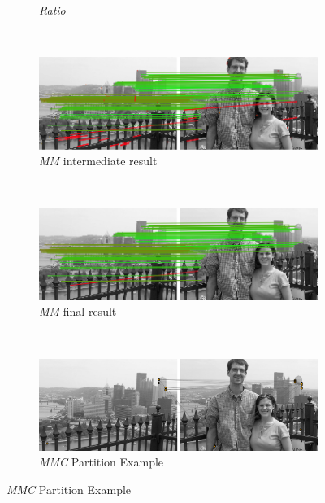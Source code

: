 \begin{figure}[h]
\begin{subfigure}[t]{0.5\columnwidth}
            \caption{\emph{Ratio}}
            \label{fig:unique}
        \end{subfigure}%
        ~ %
        \begin{subfigure}[t]{0.5\columnwidth}
            \centering
            \includegraphics[width=0.95\columnwidth]{images/mirror_match_with_pruned}
            \caption{\emph{MM} intermediate result}
            \label{fig:within}
        \end{subfigure}%
        \\ %
        \begin{subfigure}[t]{0.5\columnwidth}
            \centering
            \includegraphics[width=0.95\columnwidth]{images/mirror_match}
            \caption{\emph{MM} final result}
            \label{fig:without}
        \end{subfigure}%
        ~ %
        \begin{subfigure}[t]{0.5\columnwidth}
            \centering
            \includegraphics[width=0.95\columnwidth]{images/MMC_partition}
            \caption{\emph{MMC} Partition Example}

\end{subfigure}
\end{figure}
